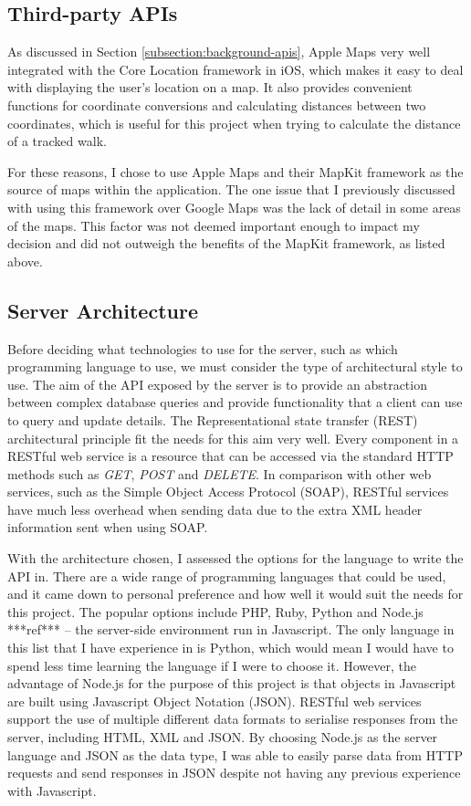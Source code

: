 \subsection{Third-party APIs}

As discussed in Section \ref{subsection:background-apis}, Apple Maps very well integrated with the Core Location framework in iOS, which makes it easy to deal with displaying the user's location on a map. It also provides convenient functions for coordinate conversions and calculating distances between two coordinates, which is useful for this project when trying to calculate the distance of a tracked walk.

For these reasons, I chose to use Apple Maps and their MapKit framework as the source of maps within the application. The one issue that I previously discussed with using this framework over Google Maps was the lack of detail in some areas of the maps. This factor was not deemed important enough to impact my decision and did not outweigh the benefits of the MapKit framework, as listed above.


\subsection{Server Architecture}

Before deciding what technologies to use for the server, such as which programming language to use, we must consider the type of architectural style to use. The aim of the API exposed by the server is to provide an abstraction between complex database queries and provide functionality that a client can use to query and update details. The Representational state transfer (REST) architectural principle fit the needs for this aim very well. Every component in a RESTful web service is a resource that can be accessed via the standard HTTP methods such as \textit{GET}, \textit{POST} and \textit{DELETE}. In comparison with other web services, such as the Simple Object Access Protocol (SOAP), RESTful services have much less overhead when sending data due to the extra XML header information sent when using SOAP.

With the architecture chosen, I assessed the options for the language to write the API in. There are a wide range of programming languages that could be used, and it came down to personal preference and how well it would suit the needs for this project. The popular options include PHP, Ruby, Python and Node.js ***ref*** -- the server-side environment run in Javascript. The only language in this list that I have experience in is Python, which would mean I would have to spend less time learning the language if I were to choose it. However, the advantage of Node.js for the purpose of this project is that objects in Javascript are built using Javascript Object Notation (JSON). RESTful web services support the use of multiple different data formats to serialise responses from the server, including HTML, XML and JSON. By choosing Node.js as the server language and JSON as the data type, I was able to easily parse data from HTTP requests and send responses in JSON despite not having any previous experience with Javascript.

